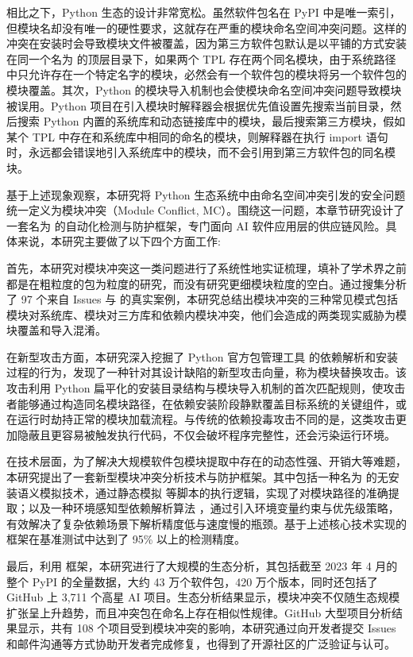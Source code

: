 相比之下，Python 生态的设计非常宽松。虽然软件包名在 PyPI 中是唯一索引，但模块名却没有唯一的硬性要求，这就存在严重的模块命名空间冲突问题。这样的冲突在安装时会导致模块文件被覆盖，因为第三方软件包默认是以平铺的方式安装在同一个名为  的顶层目录下，如果两个 TPL 存在两个同名模块，由于系统路径中只允许存在一个特定名字的模块，必然会有一个软件包的模块将另一个软件包的模块覆盖。其次，Python 的模块导入机制也会使模块命名空间冲突问题导致模块被误用。Python 项目在引入模块时解释器会根据优先值设置先搜索当前目录，然后搜索 Python 内置的系统库和动态链接库中的模块，最后搜索第三方模块，假如某个 TPL 中存在和系统库中相同的命名的模块，则解释器在执行 import 语句时，永远都会错误地引入系统库中的模块，而不会引用到第三方软件包的同名模块。

基于上述现象观察，本研究将 Python 生态系统中由命名空间冲突引发的安全问题统一定义为模块冲突（Module Conflict, MC）。围绕这一问题，本章节研究设计了一套名为  的自动化检测与防护框架，专门面向 AI 软件应用层的供应链风险。具体来说，本研究主要做了以下四个方面工作:

首先，本研究对模块冲突这一类问题进行了系统性地实证梳理，填补了学术界之前都是在粗粒度的包为粒度的研究，而没有研究更细模块粒度的空白。通过搜集分析了 97 个来自  Issues 与  的真实案例，本研究总结出模块冲突的三种常见模式包括模块对系统库、模块对三方库和依赖内模块冲突，他们会造成的两类现实威胁为模块覆盖和导入混淆。

在新型攻击方面，本研究深入挖掘了 Python 官方包管理工具  的依赖解析和安装过程的行为，发现了一种针对其设计缺陷的新型攻击向量，称为模块替换攻击。该攻击利用 Python 扁平化的安装目录结构与模块导入机制的首次匹配规则，使攻击者能够通过构造同名模块路径，在依赖安装阶段静默覆盖目标系统的关键组件，或在运行时劫持正常的模块加载流程。与传统的依赖投毒攻击不同的是，这类攻击更加隐蔽且更容易被触发执行代码，不仅会破坏程序完整性，还会污染运行环境。

在技术层面，为了解决大规模软件包模块提取中存在的动态性强、开销大等难题，本研究提出了一套新型模块冲突分析技术与防护框架。其中包括一种名为  的无安装语义模拟技术，通过静态模拟  等脚本的执行逻辑，实现了对模块路径的准确提取；以及一种环境感知型依赖解析算法 ，通过引入环境变量约束与优先级策略，有效解决了复杂依赖场景下解析精度低与速度慢的瓶颈。基于上述核心技术实现的  框架在基准测试中达到了 95\% 以上的检测精度。

最后，利用  框架，本研究进行了大规模的生态分析，其包括截至 2023 年 4 月的整个 PyPI 的全量数据，大约 43 万个软件包，420 万个版本，同时还包括了 GitHub 上 3,711 个高星 AI 项目。生态分析结果显示，模块冲突不仅随生态规模扩张呈上升趋势，而且冲突包在命名上存在相似性规律。GitHub 大型项目分析结果显示，共有 108 个项目受到模块冲突的影响，本研究通过向开发者提交 Issues 和邮件沟通等方式协助开发者完成修复，也得到了开源社区的广泛验证与认可。

